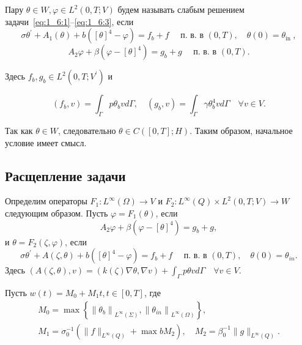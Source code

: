 \begin{definition}
    Пару $\theta \in W, \varphi \in L^{2}(0, T ; V)$ будем называть слабым
    решением задачи~\eqref{eq:1_6:1}--\eqref{eq:1_6:3}, если
    \begin{equation}
        \label{eq:1_6:4}
        \sigma \theta^{\prime}+A_{1}(\theta)+b\left([\theta]^{4}-\varphi\right)=f_{b}+f
        \quad \text { п. в. в }(0, T), \quad \theta(0)=\theta_{\text {in }},
    \end{equation}
    \begin{equation}
        \label{eq:1_6:5}
        A_{2} \varphi+\beta\left(\varphi-[\theta]^{4}\right)
        =g_{b}+g \quad \text { п. в. в }(0, T).
    \end{equation}
\end{definition}

Здесь $f_{b}, g_{b} \in L^{2}\left(0, T ; V^{\prime}\right)$ и

\[
    \left(f_{b}, v\right)=\int_{\Gamma} p \theta_{b} v d \Gamma,
    \quad\left(g_{b}, v\right)=
    \int_{\Gamma} \gamma \theta_{b}^{4} v d \Gamma \quad \forall v \in V.
\]

\begin{remark}
    Так как $\theta \in W$, следовательно $\theta \in C([0, T] ; H)$.
    Таким образом, начальное условие имеет смысл.
\end{remark}

\subsection{Расщепление задачи}
\label{subsec:ch1/sec5/subsec2}

Определим операторы $F_{1}: L^{\infty}(\Omega) \rightarrow V$ и
$F_{2}: L^{\infty}(Q) \times L^{2}(0, T ; V) \rightarrow W$ следующим образом.
Пусть $\varphi=F_{1}(\theta)$, если
\begin{equation}
    \label{eq:1_6:6}
    A_{2} \varphi+\beta\left(\varphi-[\theta]^{4}\right)=g_{b}+g,
\end{equation}
и $\theta=F_{2}(\zeta, \varphi)$, если
\begin{equation}
    \label{eq:1_6:7}
    \sigma \theta^{\prime}+A(\zeta, \theta)
    +b\left([\theta]^{4}-\varphi\right)=f_{b}+f
    \quad \text { п. в. в }(0, T), \quad \theta(0)=\theta_{i n}.
\end{equation}
Здесь
$ (A(\zeta, \theta), v)=(k(\zeta) \nabla \theta, \nabla v)
    +\int_{\Gamma} p \theta v d \Gamma \quad \forall v \in V$.

Пусть $w(t)=M_{0}+M_{1} t, t \in[0, T]$, где
\[
    \begin{gathered}
        M_{0}=\max \left\{\left\|\theta_{b}\right\|_{L^{\infty}(\Sigma)},
        \left\|\theta_{i n}\right\|_{L^{\infty}(\Omega)}\right\}, \\
        M_{1}=\sigma_{0}^{-1}\left(\|f\|_{L^{\infty}(Q)}+\max b M_{2}\right),
        \quad M_{2}=\beta_{0}^{-1}\|g\|_{L^{\infty}(Q)}.
    \end{gathered}
\]


